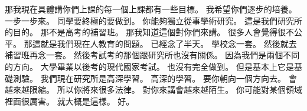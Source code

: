 \hypertarget{w01:cue:165}{}那我現在具體講你們上課的每一個上課都有一些目標。
\hypertarget{w01:cue:166}{}我希望你們逐步的培養。
\hypertarget{w01:cue:167}{}一步一步來。
\hypertarget{w01:cue:168}{}同學要終極的要做到。
\hypertarget{w01:cue:169}{}你能夠獨立從事學術研究。
\hypertarget{w01:cue:170}{}這是我們研究所的目的。
\hypertarget{w01:cue:171}{}那不是高考的補習班。
\hypertarget{w01:cue:172}{}那我知道這個對你們來講。
\hypertarget{w01:cue:173}{}很多人會覺得很不公平。
\hypertarget{w01:cue:174}{}那這就是我們現在人教育的問題。
\hypertarget{w01:cue:175}{}已經念了半天。
\hypertarget{w01:cue:176}{}學校念一套。
\hypertarget{w01:cue:177}{}然後就去補習班再念一套。
\hypertarget{w01:cue:178}{}然後考試考的那個跟研究所也沒有關係。
\hypertarget{w01:cue:179}{}因為我們是兩個不同的方向。
\hypertarget{w01:cue:180}{}大學畢業以後考的現代國家考試。
\hypertarget{w01:cue:181}{}也沒有完全做到。
\hypertarget{w01:cue:182}{}但是基本上它是基礎測驗。
\hypertarget{w01:cue:183}{}我們現在研究所是高深學習。
\hypertarget{w01:cue:184}{}高深的學習。
\hypertarget{w01:cue:185}{}要你朝向一個方向去。
\hypertarget{w01:cue:186}{}會越來越限縮。
\hypertarget{w01:cue:187}{}所以你將來很多法律。
\hypertarget{w01:cue:188}{}對你來講會越來越陌生。
\hypertarget{w01:cue:189}{}你可能對某個領域裡面很厲害。
\hypertarget{w01:cue:190}{}就大概是這樣。
\hypertarget{w01:cue:191}{}好。

